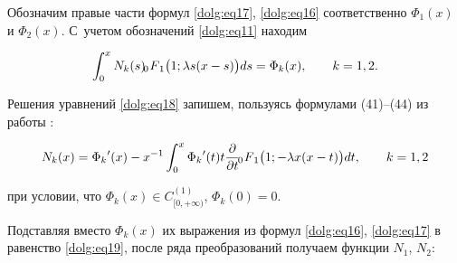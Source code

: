 Обозначим правые части формул \eqref{dolg:eq17}, \eqref{dolg:eq16} соответственно $\Phi_1(x)$ и $\Phi_2(x)$. С~учетом обозначений \eqref{dolg:eq11} находим

\begin{equation}\label{dolg:eq18}

\int _0^x N_k(s) \,\,

F_{\hspace{-4mm}0 \hspace{3mm}1} \bigl(1;\lambda s (x-s)\bigr) ds = \Phi_k(x), \qquad k = 1, 2.

\end{equation}



Решения уравнений \eqref{dolg:eq18} запишем, пользуясь формулами (41)--(44) из работы \cite[с.~586]{dolg:10}:

\begin{equation}\label{dolg:eq19}

N_k(x) = {\Phi_k}'(x) - x^{-1} \int _0^x {\Phi_k}'(t) t \frac{\partial}{\partial t} \,\,

F_{\hspace{-4mm}0 \hspace{3mm}1} \bigl(1;-\lambda x (x-t)\bigr) dt, \qquad k = 1, 2

\end{equation}

при условии, что $\Phi_k(x) \in C_{[0, +\infty)}^{(1)}$, $\Phi_k(0)=0$.

Подставляя вместо $\Phi_k(x)$ их выражения из формул \eqref{dolg:eq16}, \eqref{dolg:eq17} в равенство \eqref{dolg:eq19}, после ряда преобразований получаем функции $N_1$, $N_2$:

